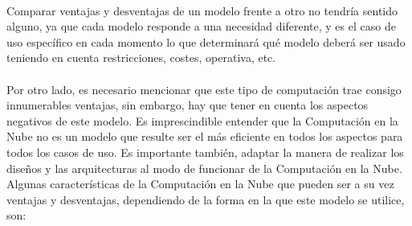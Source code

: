 \documentclass[../../memoria.tex]{subfiles}
\begin{document}
\paragraph{}
Comparar ventajas y desventajas de un modelo frente a otro no tendría sentido alguno, ya que cada modelo responde a una necesidad diferente, y es el caso de uso específico en cada momento lo que determinará qué modelo deberá ser usado teniendo en cuenta restricciones, costes, operativa, etc.

\paragraph{}
Por otro lado, es necesario mencionar que este tipo de computación trae consigo innumerables ventajas, sin embargo, hay que tener en cuenta los aspectos negativos de este modelo. Es imprescindible entender que la
Computación en la Nube no es un modelo que resulte ser el más eficiente en todos los aspectos para todos los casos de uso. Es importante también, adaptar la manera de realizar los diseños y las arquitecturas al modo de funcionar de la Computación en la Nube. Algunas características de la Computación en la Nube que pueden ser a su vez ventajas y desventajas, dependiendo de la forma en la que este modelo se utilice, son:
\end{document}
